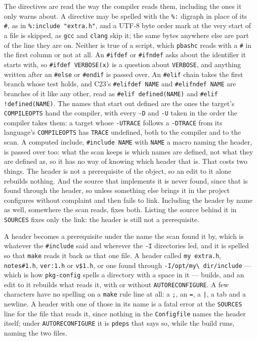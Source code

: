 \documentclass{article}
\begin{document}
The directives are read the way the compiler reads them, including the
ones it only warns about.  A directive may be spelled with the
\texttt{\%:} digraph in place of its \texttt{\#}, as in
\texttt{\%:include "extra.h"}, and a UTF-8 byte order mark at the very
start of a file is skipped, as \texttt{gcc} and \texttt{clang} skip
it; the same bytes anywhere else are part of the line they are on.
Neither is true of a script, which \texttt{pbashc} reads with a
\texttt{\#} in the first column or not at all.  An \texttt{\#ifdef}
or \texttt{\#ifndef} asks about the identifier it starts with, so
\texttt{\#ifdef VERBOSE(x)} is a question about \texttt{VERBOSE}, and
anything written after an \texttt{\#else} or \texttt{\#endif} is
passed over.  An \texttt{\#elif} chain takes the first branch whose
test holds, and C23's \texttt{\#elifdef NAME} and \texttt{\#elifndef
NAME} are branches of it like any other, read as \texttt{\#elif
defined(NAME)} and \texttt{\#elif !defined(NAME)}.  The
names that start out defined are the ones the target's
\texttt{COMPILEOPTS} hand the compiler, with every \texttt{-D} and
\texttt{-U} taken in the order the compiler takes them: a target
whose \texttt{-UTRACE} follows a \texttt{-DTRACE} from its
language's \texttt{COMPILEOPTS} has \texttt{TRACE} undefined, both
to the compiler and to the scan.  A
computed include, \texttt{\#include NAME} with \texttt{NAME} a macro
naming the header, is passed over too: what the scan keeps is which
names are defined, not what they are defined as, so it has no way of
knowing which header that is.  That costs two things.  The header is
not a prerequisite of the object, so an edit to it alone rebuilds
nothing.  And the source that implements it is never found, since that
is found through the header, so unless something else brings it in the
project configures without complaint and then fails to link.  Including
the header by name as well, somewhere the scan reads, fixes both.
Listing the source behind it in \texttt{SOURCES} fixes only the link:
the header is still not a prerequisite.

A header becomes a prerequisite under the name the scan found it by,
which is whatever the \texttt{\#include} said and wherever the
\texttt{-I} directories led, and it is spelled so that \texttt{make}
reads it back as that one file.  A header called \texttt{my extra.h},
\texttt{notes\#1.h}, \texttt{ver:1.h} or \texttt{v\$1.h}, or one found
through \texttt{-I/opt/my\textbackslash\ dir/include} --- which is how
\texttt{pkg-config} spells a directory with a space in it --- builds,
and an edit to it rebuilds what reads it, with or without
\texttt{AUTORECONFIGURE}.  A few characters have no spelling on a
\texttt{make} rule line at all: a \texttt{;}, an \texttt{=}, a
\texttt{|}, a tab and a newline.  A header with one of those in its
name is a fatal error at the \texttt{SOURCES} line for the file that
reads it, since nothing in the \texttt{Configfile} names the header
itself; under \texttt{AUTORECONFIGURE} it is \texttt{pdeps} that says
so, while the build runs, naming the two files.
\end{document}
